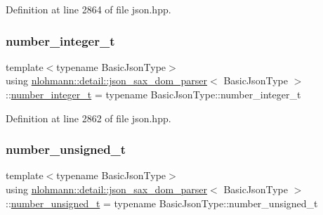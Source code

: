 Definition at line 2864 of file json.\+hpp.

\mbox{\label{classnlohmann_1_1detail_1_1json__sax__dom__parser_a3d5cd67d179aa7422ce90e54984a441e}} 
\subsubsection{\texorpdfstring{number\_integer\_t}{number\_integer\_t}}
{\footnotesize\ttfamily template$<$typename Basic\+Json\+Type$>$ \\
using \mbox{\hyperlink{classnlohmann_1_1detail_1_1json__sax__dom__parser}{nlohmann\+::detail\+::json\+\_\+sax\+\_\+dom\+\_\+parser}}$<$ Basic\+Json\+Type $>$\+::\mbox{\hyperlink{classnlohmann_1_1detail_1_1json__sax__dom__parser_a3d5cd67d179aa7422ce90e54984a441e}{number\+\_\+integer\+\_\+t}} =  typename Basic\+Json\+Type\+::number\+\_\+integer\+\_\+t}



Definition at line 2862 of file json.\+hpp.

\mbox{\label{classnlohmann_1_1detail_1_1json__sax__dom__parser_a90f19b272530a479db81db11be2ea15c}} 
\subsubsection{\texorpdfstring{number\_unsigned\_t}{number\_unsigned\_t}}
{\footnotesize\ttfamily template$<$typename Basic\+Json\+Type$>$ \\
using \mbox{\hyperlink{classnlohmann_1_1detail_1_1json__sax__dom__parser}{nlohmann\+::detail\+::json\+\_\+sax\+\_\+dom\+\_\+parser}}$<$ Basic\+Json\+Type $>$\+::\mbox{\hyperlink{classnlohmann_1_1detail_1_1json__sax__dom__parser_a90f19b272530a479db81db11be2ea15c}{number\+\_\+unsigned\+\_\+t}} =  typename Basic\+Json\+Type\+::number\+\_\+unsigned\+\_\+t}



